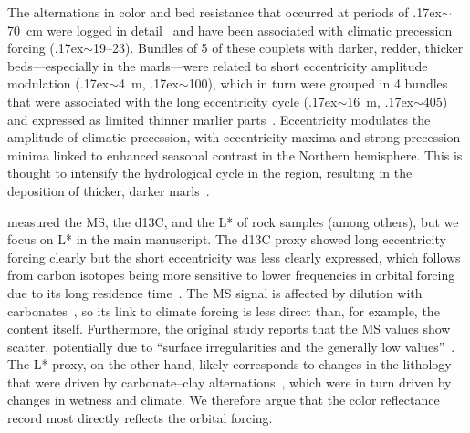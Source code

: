 \documentclass[draft]{agujournal2019}
\newcommand{\appr}{\raise.17ex\hbox{$\scriptstyle\sim$}} %
\begin{document}
The alternations in color and bed resistance that occurred at periods of \appr\qty{70}{\cm} were logged in detail~\cite{Batenburg2012,Dinares-Turell2013}
and have been associated with climatic precession forcing (\appr\qtyrange{19}{23}{\kiloyear}).
Bundles of 5 of these couplets with darker, redder, thicker beds---especially in the marls---were related to short eccentricity amplitude modulation (\appr\qty{4}{\metre}, \appr\qty{100}{\kiloyear}),
which in turn were grouped in 4 bundles that were associated with the long eccentricity cycle (\appr\qty{16}{\metre}, \appr\qty{405}{\kiloyear}) and expressed as limited thinner marlier parts~\cite{Batenburg2012,Batenburg2014}.
Eccentricity modulates the amplitude of climatic precession,
with eccentricity maxima and strong precession minima linked to enhanced seasonal contrast in the Northern hemisphere.
This is thought to intensify the hydrological cycle in the region, resulting in the deposition of thicker, darker marls~\cite{Batenburg2014}.

 measured the \gls{MS}, the \gls{d13C}, and the \gls{L*} of rock samples (among others), but we focus on \gls{L*} in the main manuscript.
The \gls{d13C} proxy showed long eccentricity forcing clearly but the short eccentricity was less clearly expressed,
which follows from carbon isotopes being more sensitive to lower frequencies in orbital forcing due to its long residence time~\cite{Zeebe2017,Kocken2019loscar}.
The \gls{MS} signal is affected by dilution with carbonates~\cite{tenKateSprenger1993}, so its link to climate forcing is less direct than, for example, the  content itself.
Furthermore, the original study reports that the \gls{MS} values show scatter, potentially due to ``surface irregularities and the generally low values''~\cite{Batenburg2012}.
The \gls{L*} proxy, on the other hand, likely corresponds to changes in the lithology that were driven by carbonate--clay alternations~\cite{MountWard1986,Batenburg2012},
which were in turn driven by changes in wetness and climate.
We therefore argue that the color reflectance record most directly reflects the orbital forcing.
\end{document}

